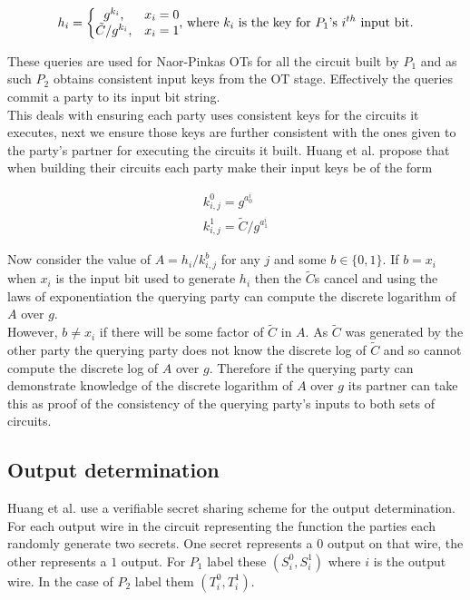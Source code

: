 \documentclass[ %
                    author={Nicholas Tutte},
                supervisor={Prof. Nigel Smart},
                    degree={MEng},
                     title={Secure Two Party Computation},
                  subtitle={A practical comparison of recent protocols},
                      type={Research - GG1K},
                      year={2015} ]{dissertation}
\begin{document}
				$$
				h_i = \bigg\{
					\begin{matrix}
						g^{k_i}, & x_i = 0\\
						\tilde C / g^{k_i}, & x_i = 1
					\end{matrix}
					\textnormal{,  where } k_i \textnormal{ is the key for } P_1 \textnormal{'s } i^{th} \textnormal{ input bit.}
				$$

				These queries are used for Naor-Pinkas OTs for all the circuit built by $P_1$ and as such $P_2$ obtains consistent input keys from the OT stage. Effectively the queries commit a party to its input bit string.\\

				This deals with ensuring each party uses consistent keys for the circuits it executes, next we ensure those keys are further consistent with the ones given to the party's partner for executing the circuits it built. Huang et al. propose that when building their circuits each party make their input keys be of the form
				
				$$
				\begin{matrix}
					k_{i,j}^0 = g^{a_0^i}\\
					k_{i,j}^1 = \tilde C / g^{a_1^i}
				\end{matrix}
				$$

				Now consider the value of $A = h_i / k_{i,j}^{b}$ for any $j$ and some $b \in \{0, 1\}$. If $b = x_i$ when $x_i$ is the input bit used to generate $h_i$ then the $\tilde C$s cancel and using the laws of exponentiation the querying party can compute the discrete logarithm of $A$ over $g$.\\

				However, $b \neq x_i$ if there will be some factor of $\tilde C$ in $A$. As $\tilde C$ was generated by the other party the querying party does not know the discrete log of $\tilde C$ and so cannot compute the discrete log of $A$ over $g$. Therefore if the querying party can demonstrate knowledge of the discrete logarithm of $A$ over $g$ its partner can take this as proof of the consistency of the querying party's inputs to both sets of circuits.

			\subsection{Output determination}
				Huang et al. use a verifiable secret sharing scheme for the output determination. For each output wire in the circuit representing the function the parties each randomly generate two secrets. One secret represents a $0$ output on that wire, the other represents a $1$ output. For $P_1$ label these $(S_i^0, S_i^1)$ where $i$ is the output wire. In the case of $P_2$ label them $(T_i^0, T_i^1)$.\\
\end{document}
